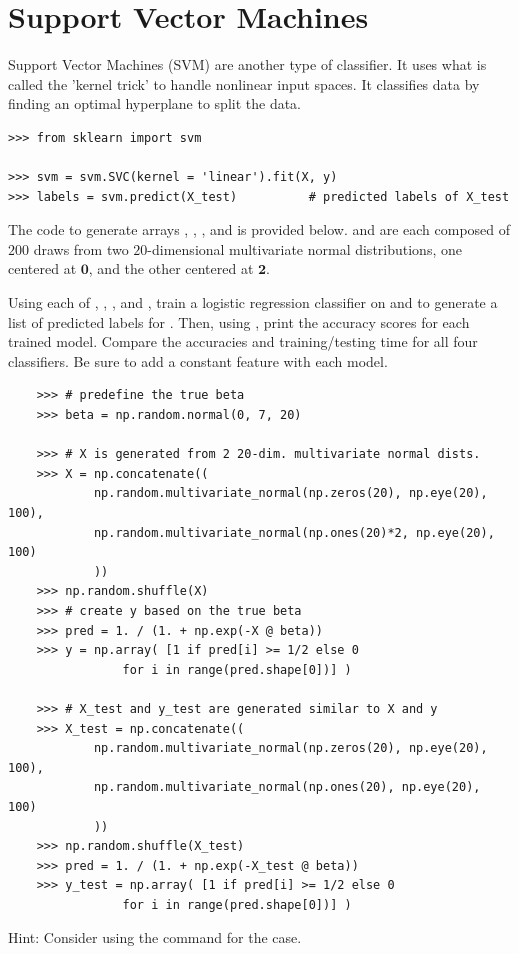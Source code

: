 \section*{Support Vector Machines}

Support Vector Machines (SVM) are another type of classifier. It uses what is called the 'kernel trick' to handle nonlinear input spaces. It classifies data by finding an optimal hyperplane to split the data.
\begin{lstlisting}
>>> from sklearn import svm

>>> svm = svm.SVC(kernel = 'linear').fit(X, y)
>>> labels = svm.predict(X_test)          # predicted labels of X_test
\end{lstlisting}


\begin{problem}
    The code to generate arrays , , , and  is provided below.
     and  are each composed of $200$ draws from two $20$-dimensional multivariate normal distributions, one centered at $\boldsymbol{0}$, and the other centered at $\boldsymbol{2}$.

    Using each of , , , and , train a logistic regression classifier on  and  to generate a list of predicted labels for .
    Then, using , print the accuracy scores for each trained model.
    Compare the accuracies and training/testing time for all four classifiers.
    Be sure to add a constant feature with each model.

    \begin{lstlisting}
    >>> # predefine the true beta
    >>> beta = np.random.normal(0, 7, 20)

    >>> # X is generated from 2 20-dim. multivariate normal dists.
    >>> X = np.concatenate((
            np.random.multivariate_normal(np.zeros(20), np.eye(20), 100),
            np.random.multivariate_normal(np.ones(20)*2, np.eye(20), 100)
            ))
    >>> np.random.shuffle(X)
    >>> # create y based on the true beta
    >>> pred = 1. / (1. + np.exp(-X @ beta))
    >>> y = np.array( [1 if pred[i] >= 1/2 else 0
                for i in range(pred.shape[0])] )

    >>> # X_test and y_test are generated similar to X and y
    >>> X_test = np.concatenate((
            np.random.multivariate_normal(np.zeros(20), np.eye(20), 100),
            np.random.multivariate_normal(np.ones(20), np.eye(20), 100)
            ))
    >>> np.random.shuffle(X_test)
    >>> pred = 1. / (1. + np.exp(-X_test @ beta))
    >>> y_test = np.array( [1 if pred[i] >= 1/2 else 0
                for i in range(pred.shape[0])] )
    \end{lstlisting}
    Hint: Consider using the command  for the  case.
\end{problem}



